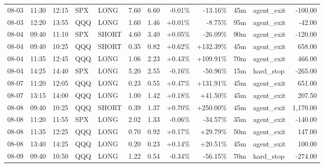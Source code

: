 \documentclass[11pt,a4paper,twoside]{article}
\begin{document}
\begin{center}
\begin{longtable}{>{\color{txtmain}}l l l l l r r r r r >{\color{txtmain}}l r}
08-03 & 11:30 & 12:15 & SPX & LONG & 7.60 & 6.60 & \textcolor{lossred}{-0.01\%} & \textcolor{lossred}{-13.16\%} & 45m & agent\_exit & \textcolor{lossred}{-100.00} \\
08-03 & 12:20 & 13:55 & QQQ & LONG & 1.60 & 1.46 & \textcolor{wingreen}{+0.01\%} & \textcolor{lossred}{-8.75\%} & 95m & agent\_exit & \textcolor{lossred}{-42.00} \\
08-04 & 09:40 & 11:10 & SPX & SHORT & 4.60 & 3.40 & \textcolor{wingreen}{+0.05\%} & \textcolor{lossred}{-26.09\%} & 90m & agent\_exit & \textcolor{lossred}{-120.00} \\
08-04 & 09:40 & 10:25 & QQQ & SHORT & 0.35 & 0.82 & \textcolor{wingreen}{+0.62\%} & \textcolor{wingreen}{+132.39\%} & 45m & agent\_exit & \textcolor{wingreen}{658.00} \\
08-04 & 11:35 & 12:45 & QQQ & LONG & 1.06 & 2.23 & \textcolor{wingreen}{+0.43\%} & \textcolor{wingreen}{+109.91\%} & 70m & agent\_exit & \textcolor{wingreen}{466.00} \\
08-04 & 14:25 & 14:40 & SPX & LONG & 5.20 & 2.55 & \textcolor{lossred}{-0.16\%} & \textcolor{lossred}{-50.96\%} & 15m & hard\_stop & \textcolor{lossred}{-265.00} \\
08-07 & 11:20 & 12:05 & QQQ & LONG & 0.23 & 0.55 & \textcolor{wingreen}{+0.47\%} & \textcolor{wingreen}{+131.91\%} & 45m & agent\_exit & \textcolor{wingreen}{651.00} \\
08-07 & 13:15 & 14:00 & QQQ & LONG & 1.00 & 1.42 & \textcolor{wingreen}{+0.18\%} & \textcolor{wingreen}{+41.50\%} & 45m & agent\_exit & \textcolor{wingreen}{207.50} \\
08-08 & 09:40 & 10:25 & QQQ & SHORT & 0.39 & 1.37 & \textcolor{wingreen}{+0.70\%} & \textcolor{wingreen}{+250.00\%} & 45m & agent\_exit & \textcolor{wingreen}{1,170.00} \\
08-08 & 11:20 & 11:55 & SPX & LONG & 2.02 & 1.33 & \textcolor{lossred}{-0.06\%} & \textcolor{lossred}{-34.57\%} & 35m & agent\_exit & \textcolor{lossred}{-140.00} \\
08-08 & 11:35 & 12:25 & QQQ & LONG & 0.70 & 0.92 & \textcolor{wingreen}{+0.17\%} & \textcolor{wingreen}{+29.79\%} & 50m & agent\_exit & \textcolor{wingreen}{147.00} \\
08-08 & 13:40 & 14:25 & QQQ & LONG & 0.20 & 0.23 & \textcolor{wingreen}{+0.14\%} & \textcolor{wingreen}{+20.51\%} & 45m & agent\_exit & \textcolor{wingreen}{100.00} \\
08-09 & 09:40 & 10:50 & QQQ & LONG & 1.22 & 0.54 & \textcolor{lossred}{-0.34\%} & \textcolor{lossred}{-56.15\%} & 70m & hard\_stop & \textcolor{lossred}{-274.00} \\

\end{longtable}
\end{center}
\end{document}
